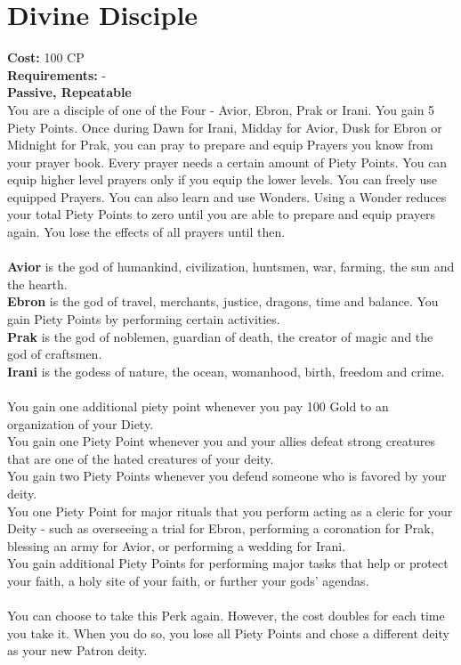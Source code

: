 \section{Divine Disciple}\label{perk:divineDisciple}
\textbf{Cost:} 100 CP\\
\textbf{Requirements:} - \\
\textbf{Passive, Repeatable}\\
You are a disciple of one of the Four - Avior, Ebron, Prak or Irani.
You gain 5 Piety Points.
Once during Dawn for Irani, Midday for Avior, Dusk for Ebron or Midnight for Prak, you can pray to prepare and equip Prayers you know from your prayer book.
Every prayer needs a certain amount of Piety Points.
You can equip higher level prayers only if you equip the lower levels.
You can freely use equipped Prayers.
You can also learn and use Wonders.
Using a Wonder reduces your total Piety Points to zero until you are able to prepare and equip prayers again.
You lose the effects of all prayers until then.\\
\\
\textbf{Avior} is the god of humankind, civilization, huntsmen, war, farming, the sun and the hearth.\\
\textbf{Ebron} is the god of travel, merchants, justice, dragons, time and balance.
You gain Piety Points by performing certain activities.\\
\textbf{Prak} is the god of noblemen, guardian of death, the creator of magic and the god of craftsmen.\\
\textbf{Irani} is the godess of nature, the ocean, womanhood, birth, freedom and crime.\\
\\
You gain one additional piety point whenever you pay 100 Gold to an organization of your Diety.\\
You gain one Piety Point whenever you and your allies defeat strong creatures that are one of the hated creatures of your deity.\\
You gain two Piety Points whenever you defend someone who is favored by your deity.\\
You one Piety Point for major rituals that you perform acting as a cleric for your Deity - such as overseeing a trial for Ebron, performing a coronation for Prak, blessing an army for Avior, or performing a wedding for Irani.\\
You gain additional Piety Points for performing major tasks that help or protect your faith, a holy site of your faith, or further your gods' agendas.\\
\\
You can choose to take this Perk again.
However, the cost doubles for each time you take it.
When you do so, you lose all Piety Points and chose a different deity as your new Patron deity.